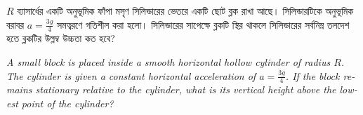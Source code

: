 \documentclass[12pt, a4paper]{article}
\begin{document}
\begin{tcolorbox}[questionbox={প্রশ্ন (Question) 42}]
    \noindent
    $R$ ব্যাসার্ধের একটি অনুভূমিক ফাঁপা মসৃণ সিলিন্ডারের ভেতরে একটি ছোট ব্লক রাখা আছে। সিলিন্ডারটিকে অনুভূমিক বরাবর $a = \frac{3g}{4}$ সমত্বরণে গতিশীল করা হলো। সিলিন্ডারের সাপেক্ষে ব্লকটি স্থির থাকলে সিলিন্ডারের সর্বনিম্ন তলদেশ হতে ব্লকটির উল্লম্ব উচ্চতা কত হবে?
    
    \vspace{0.8em}
    \begin{english}
    \noindent\textit{\color{darkgray}
    A small block is placed inside a smooth horizontal hollow cylinder of radius $R$. The cylinder is given a constant horizontal acceleration of $a = \frac{3g}{4}$. If the block remains stationary relative to the cylinder, what is its vertical height above the lowest point of the cylinder?
    }
    \end{english}
\end{tcolorbox}
\end{document}
